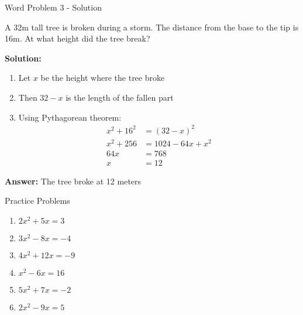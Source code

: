 \documentclass[aspectratio=169]{beamer}
\begin{document}
\begin{frame}{Word Problem 3 - Solution}
    \begin{tcolorbox}[colback=lightgray,colframe=accent,title=Detailed Solution]
        \footnotesize
        A 32m tall tree is broken during a storm. The distance from the base to the tip is 16m. At what height did the tree break?
        
        \textbf{Solution:}
        \begin{enumerate}
            \setlength{\itemsep}{0.5em}
            \item Let $x$ be the height where the tree broke
            \item Then $32 - x$ is the length of the fallen part
            \item Using Pythagorean theorem:
            \begin{align*}
                x^2 + 16^2 &= (32 - x)^2 \\
                x^2 + 256 &= 1024 - 64x + x^2 \\
                64x &= 768 \\
                x &= 12
            \end{align*}
        \end{enumerate}
        
        \textbf{Answer:} The tree broke at 12 meters
    \end{tcolorbox}
\end{frame}

\begin{frame}{Practice Problems}
    \begin{tcolorbox}[colback=lightgray,colframe=primary,title=Solve Each of the Following]
        \footnotesize
        \begin{enumerate}
            \setlength{\itemsep}{0.5em}
            \item $2x^2 + 5x = 3$
            \item $3x^2 - 8x = -4$
            \item $4x^2 + 12x = -9$
            \item $x^2 - 6x = 16$
            \item $5x^2 + 7x = -2$
            \item $2x^2 - 9x = 5$
        \end{enumerate}
    \end{tcolorbox}
\end{frame}
\end{document}
